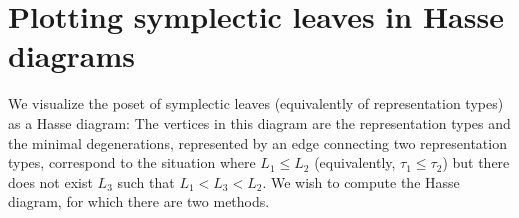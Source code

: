 \documentclass[letterpaper,10pt,english]{sphinxmanual}
\begin{document}
\begin{fulllineitems}
\begin{sphinxVerbatim}[commandchars=\\\{\}]
\PYG{p}{[}    \PYG{p}{]}
\PYG{p}{[}    \PYG{p}{]}
\PYG{p}{[}    \PYG{p}{]}\PYG{p}{]}
\PYG{p}{[}\PYG{p}{[}    \PYG{p}{]}
\PYG{p}{[}    \PYG{p}{]}
\PYG{p}{[}    \PYG{p}{]}
\PYG{p}{[}    \PYG{p}{]}
\PYG{p}{[}    \PYG{p}{]}\PYG{p}{]}
\PYG{p}{]}
\end{sphinxVerbatim}

\end{fulllineitems}



\chapter{Plotting symplectic leaves in Hasse diagrams}
\label{\detokenize{index:plotting-symplectic-leaves-in-hasse-diagrams}}
\sphinxAtStartPar
We visualize the poset of symplectic leaves (equivalently of representation types) as a Hasse diagram: The vertices in this diagram are the representation types and the minimal degenerations, represented by an edge connecting two representation types, correspond to the situation where \(L_1\leq L_2\) (equivalently, \(\tau_1\leq\tau_2\)) but there does not exist \(L_3\) such that \(L_1 < L_3 < L_2\). We wish to compute the Hasse diagram, for which there are two methods.
\end{document}

